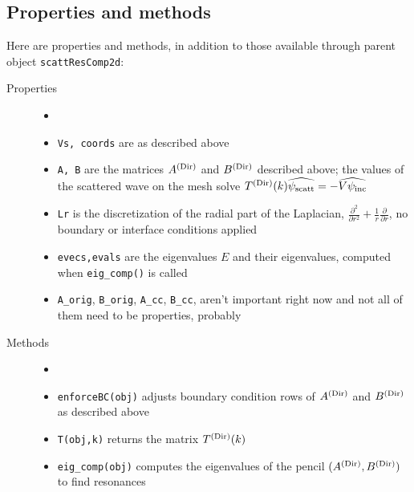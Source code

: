 \subsection{Properties and methods}
\label{sec-dirBC-properties}

Here are properties and methods, in addition to those
available through
parent object {\tt scattResComp2d}:
\begin{description}
 \item[Properties]
   \begin{itemize}
    \item[]
    \item {\tt Vs, coords} are as described above
    \item {\tt A, B} are the matrices $A^{(\text{Dir})}$ and $B^{(\text{Dir})}$ described above;
          the values of the scattered wave on the mesh solve
          $T^{(\text{Dir})}(k)\widehat{\psi_{\text{scatt}}} = -\widehat{V\psi_{\text{inc}}}$
    \item {\tt Lr} is the discretization of the radial part of the
          Laplacian, $\frac{\partial^2}{\partial r^2} +     
          \frac{1}{r}\frac{\partial}{\partial r}$, no boundary
          or interface conditions applied
    \item {\tt evecs,evals} are the eigenvalues $E$ and their
          eigenvalues, computed when {\tt eig\_comp()} is called
    \item {\tt A\_orig}, {\tt B\_orig}, {\tt A\_cc}, {\tt B\_cc},
          aren't important right now and
          not all of them need to be properties, probably
   \end{itemize}
 \item[Methods]
   \begin{itemize}
    \item[]
    \item {\tt enforceBC(obj)} adjusts boundary condition rows of 
          $A^{(\text{Dir})}$ and $B^{(\text{Dir})}$
          as described above
    \item {\tt T(obj,k)} returns the matrix $T^{(\text{Dir})}(k)$
    \item {\tt eig\_comp(obj)} computes the eigenvalues of the pencil
          $(A^{(\text{Dir})},B^{(\text{Dir})})$ to find resonances
   \end{itemize}
\end{description}


